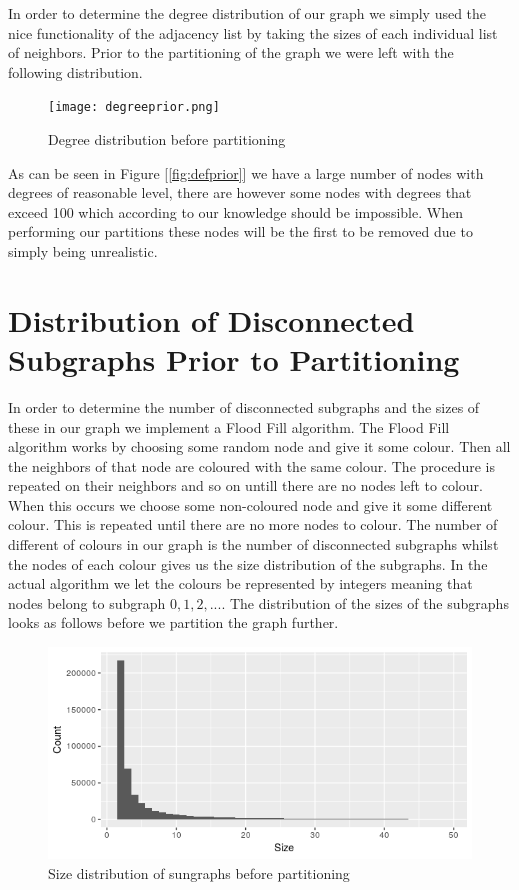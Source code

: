 \documentclass[a4paper,10pt]{article}
\newcommand\bref[1]{[\ref{#1}]}
\begin{document}
In order to determine the degree distribution of our graph we simply used the nice functionality of the adjacency list by taking the sizes of each individual list of neighbors. Prior to the partitioning of the graph we were left with the following distribution.

\begin{figure}
	\centering
	\texttt{[image: degreeprior.png]}
	\caption{Degree distribution before partitioning}
	\label{fig:degprior}
\end{figure}

As can be seen in Figure \bref{fig:defprior} we have a large number of nodes with degrees of reasonable level, there are however some nodes with degrees that exceed 100 which according to our knowledge should be impossible. When performing our partitions these nodes will be the first to be removed due to            simply being unrealistic.

\section{Distribution of Disconnected Subgraphs Prior to Partitioning}

In order to determine the number of disconnected subgraphs and the sizes of these in our graph we implement a Flood Fill algorithm. The Flood Fill algorithm works by choosing some random node and give it some colour. Then all the neighbors of that node are coloured with the same colour. The procedure is repeated on their neighbors and so on untill there are no nodes left to colour. When this occurs we choose some non-coloured node and give it some different colour. This is repeated until there are no more nodes to colour. The number of different of colours in our graph is the number of disconnected subgraphs whilst the nodes of each colour gives us the size distribution of the subgraphs. In the actual algorithm we let the colours be represented by integers meaning that nodes belong to subgraph $0,1,2,...$. The distribution of the sizes of the subgraphs looks as follows before we partition the graph further.

\begin{figure}
	\centering
	\includegraphics[width=\lindwidth]{sizesprior.png}
	\caption{Size distribution of sungraphs before partitioning}
	\label{fig:sizeprior}
\end{figure}
\end{document}

